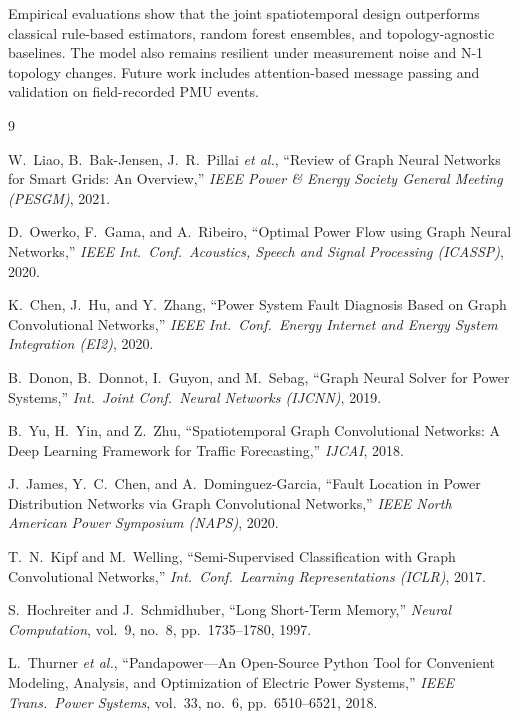 \documentclass[conference]{IEEEtran}
\begin{document}
Empirical evaluations show that the joint spatiotemporal design outperforms classical
rule-based estimators, random forest ensembles, and topology-agnostic baselines.
The model also remains resilient under measurement noise and N-1 topology changes.
Future work includes attention-based message passing and validation on field-recorded
PMU events.

\begin{thebibliography}{9}

W.~Liao, B.~Bak-Jensen, J.~R.~Pillai \emph{et al.},
``Review of Graph Neural Networks for Smart Grids: An Overview,''
\emph{IEEE Power \& Energy Society General Meeting (PESGM)}, 2021.

D.~Owerko, F.~Gama, and A.~Ribeiro,
``Optimal Power Flow using Graph Neural Networks,''
\emph{IEEE Int.\ Conf.\ Acoustics, Speech and Signal Processing (ICASSP)}, 2020.

K.~Chen, J.~Hu, and Y.~Zhang,
``Power System Fault Diagnosis Based on Graph Convolutional Networks,''
\emph{IEEE Int.\ Conf.\ Energy Internet and Energy System Integration (EI2)}, 2020.

B.~Donon, B.~Donnot, I.~Guyon, and M.~Sebag,
``Graph Neural Solver for Power Systems,''
\emph{Int.\ Joint Conf.\ Neural Networks (IJCNN)}, 2019.

B.~Yu, H.~Yin, and Z.~Zhu,
``Spatiotemporal Graph Convolutional Networks: A Deep Learning Framework
for Traffic Forecasting,''
\emph{IJCAI}, 2018.

J.~James, Y.~C.~Chen, and A.~Dominguez-Garcia,
``Fault Location in Power Distribution Networks via Graph Convolutional Networks,''
\emph{IEEE North American Power Symposium (NAPS)}, 2020.

T.~N.~Kipf and M.~Welling,
``Semi-Supervised Classification with Graph Convolutional Networks,''
\emph{Int.\ Conf.\ Learning Representations (ICLR)}, 2017.

S.~Hochreiter and J.~Schmidhuber,
``Long Short-Term Memory,''
\emph{Neural Computation}, vol.~9, no.~8, pp.~1735--1780, 1997.

L.~Thurner \emph{et al.},
``Pandapower—An Open-Source Python Tool for Convenient Modeling, Analysis,
and Optimization of Electric Power Systems,''
\emph{IEEE Trans.\ Power Systems}, vol.~33, no.~6, pp.~6510--6521, 2018.

\end{thebibliography}
\end{document}
